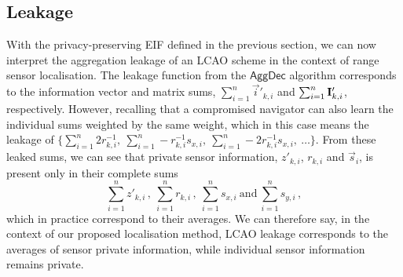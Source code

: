 \documentclass[10pt,letterpaper,oneside,twocolumn,journal]{IEEEtran}
\theoremstyle{definition}
\theoremstyle{definition}
\theoremstyle{remark}
\begin{document}
\subsection{Leakage} \label{subsec:leakage}
With the privacy-preserving EIF defined in the previous section, we can now interpret the aggregation leakage of an LCAO scheme in the context of range sensor localisation. The leakage function from the $\mathsf{AggDec}$ algorithm corresponds to the information vector and matrix sums, $\sum_{i=1}^n\vec{i}'_{k,i}$ and $\sum_{i=1}^n{{\mathbf{I}}}'_{k,i}$, respectively. However, recalling that a compromised navigator can also learn the individual sums weighted by the same weight, which in this case means the leakage of $\{\sum_{i=1}^n2r^{-1}_{k,i},\ \sum_{i=1}^n-r^{-1}_{k,i}s_{x,i},\ \sum_{i=1}^n-2r^{-1}_{k,i}s_{x,i},\ \dots\}$. From these leaked sums, we can see that private sensor information, $z'_{k,i}$, $r_{k,i}$ and $\vec{s}_i$, is present only in their complete sums
\begin{equation}
    \sum_{i=1}^nz'_{k,i}\,,\ \sum_{i=1}^nr_{k,i}\,,\ \sum_{i=1}^ns_{x,i}\ \textrm{and}\ \sum_{i=1}^ns_{y,i}\,,\label{eqn:localisation_leakage}
\end{equation}
which in practice correspond to their averages. We can therefore say, in the context of our proposed localisation method, LCAO leakage corresponds to the averages of sensor private information, while individual sensor information remains private.

% 
%                                 
%                                 
%                                 
% 
\end{document}
